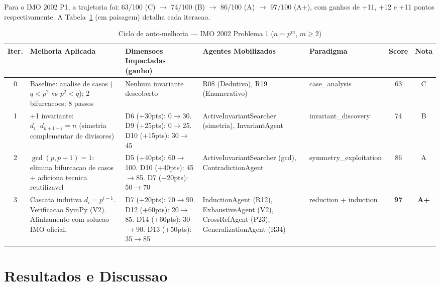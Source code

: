 \documentclass[5p]{elsarticle}
\begin{document}
Para o IMO 2002 P1, a trajetoria foi: 63/100 (C) $\to$ 74/100 (B) $\to$
86/100 (A) $\to$ 97/100 (A+), com ganhos de +11, +12 e +11 pontos
respectivamente. A Tabela~\ref{tab:improve} (em paisagem) detalha cada iteracao.

\begin{landscape}
\begin{table}[H]
  \centering
  \caption{Ciclo de auto-melhoria — IMO 2002 Problema 1 ($n=p^m$, $m\geq 2$)}
  \label{tab:improve}
  \small
  \begin{tabular}{cp{3cm}p{4.5cm}p{4.5cm}p{2cm}cc}
    \toprule
    \textbf{Iter.} & \textbf{Melhoria Aplicada} & \textbf{Dimensoes Impactadas (ganho)} & \textbf{Agentes Mobilizados} & \textbf{Paradigma} & \textbf{Score} & \textbf{Nota} \\
    \midrule
    0 & Baseline: analise de casos ($q<p^2$ vs $p^2<q$); 2 bifurcacoes; 8 passos & Nenhum invariante descoberto & R08 (Dedutivo), R19 (Enumerativo) & case\_analysis & 63 & C \\
    \rowcolor{yellowbg}
    1 & +1 invariante: $d_i\cdot d_{k+1-i}=n$ (simetria complementar de divisores) & D6 (+30pts): 0$\to$30. D9 (+25pts): 0$\to$25. D10 (+15pts): 30$\to$45 & ActiveInvariantSearcher (simetria), InvariantAgent & invariant\_discovery & 74 & B \\
    2 & $\gcd(p,p+1)=1$: elimina bifurcacao de casos + adiciona tecnica reutilizavel & D5 (+40pts): 60$\to$100. D10 (+40pts): 45$\to$85. D7 (+20pts): 50$\to$70 & ActiveInvariantSearcher (gcd), ContradictionAgent & symmetry\_exploitation & 86 & A \\
    \rowcolor{greenbg}
    3 & Cascata indutiva $d_i=p^{i-1}$. Verificacao SymPy (V2). Alinhamento com solucao IMO oficial. & D7 (+20pts): 70$\to$90. D12 (+60pts): 20$\to$85. D14 (+60pts): 30$\to$90. D13 (+50pts): 35$\to$85 & InductionAgent (R12), ExhaustiveAgent (V2), CrossRefAgent (P23), GeneralizationAgent (R34) & reduction + induction & \textbf{97} & \textbf{A+} \\
    \bottomrule
  \end{tabular}
\end{table}
\end{landscape}

\section{Resultados e Discussao}
\end{document}
